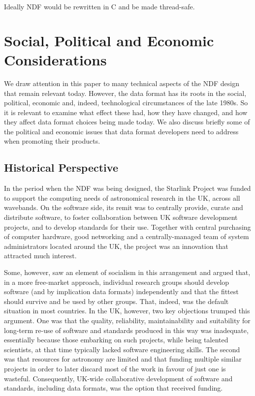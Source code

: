 \documentclass[final,authoryear,5p,times,twocolumn]{elsarticle}
\begin{document}
Ideally NDF would be rewritten in C and be made thread-safe.

\section{Social, Political and Economic Considerations}

We draw attention in this paper to many technical aspects of the NDF
design that remain relevant today. However, the data format has its
roots in the social, political, economic and, indeed, technological
circumstances of the late 1980s. So it is relevant to examine what
effect these had, how they have changed, and how they affect data
format choices being made today. We also discuss briefly some of the
political and economic issues that data format developers need to
address when promoting their products.

\subsection{Historical Perspective}

In the period when the NDF was being designed, the Starlink Project
was funded to support the computing needs of astronomical research in
the UK, across all wavebands. On the software side, its remit was to
centrally provide, curate and distribute software, to foster
collaboration between UK software development projects, and to develop
standards for their use. Together with central purchasing of computer
hardware, good networking and a centrally-managed team of system
administrators located around the UK, the project was an innovation
that attracted much interest.

Some, however, saw an element of socialism in this arrangement and
argued that, in a more free-market approach, individual research
groups should develop software (and by implication data formats)
independently and that the fittest should survive and be used by other
groups. That, indeed, was the default situation in most countries. In
the UK, however, two key objections trumped this argument. One was
that the quality, reliability, maintainability and suitability for
long-term re-use of software and standards produced in this way was
inadequate, essentially because those embarking on such projects,
while being talented scientists, at that time typically lacked software engineering
skills. The second was that resources for astronomy are limited and
that funding multiple similar projects in order to later discard most
of the work in favour of just one is wasteful. Consequently, UK-wide
collaborative development of software and standards, including data
formats, was the option that received funding.
\end{document}

